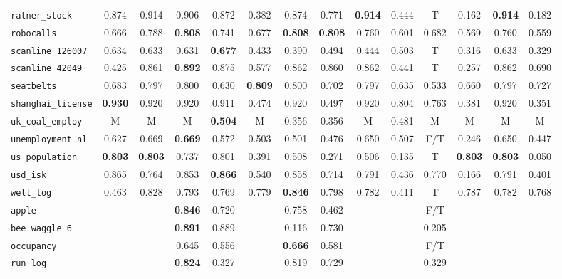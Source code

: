 \begin{tabular}{lccccccccccccc}
\verb+ratner_stock+ & 0.874 & 0.914 & 0.906 & 0.872 & 0.382 & 0.874 & 0.771 & \textbf{0.914} & 0.444 & T & 0.162 & \textbf{0.914} & 0.182\\
\verb+robocalls+ & 0.666 & 0.788 & \textbf{0.808} & 0.741 & 0.677 & \textbf{0.808} & \textbf{0.808} & 0.760 & 0.601 & 0.682 & 0.569 & 0.760 & 0.559\\
\verb+scanline_126007+ & 0.634 & 0.633 & 0.631 & \textbf{0.677} & 0.433 & 0.390 & 0.494 & 0.444 & 0.503 & T & 0.316 & 0.633 & 0.329\\
\verb+scanline_42049+ & 0.425 & 0.861 & \textbf{0.892} & 0.875 & 0.577 & 0.862 & 0.860 & 0.862 & 0.441 & T & 0.257 & 0.862 & 0.690\\
\verb+seatbelts+ & 0.683 & 0.797 & 0.800 & 0.630 & \textbf{0.809} & 0.800 & 0.702 & 0.797 & 0.635 & 0.533 & 0.660 & 0.797 & 0.727\\
\verb+shanghai_license+ & \textbf{0.930} & 0.920 & 0.920 & 0.911 & 0.474 & 0.920 & 0.497 & 0.920 & 0.804 & 0.763 & 0.381 & 0.920 & 0.351\\
\verb+uk_coal_employ+ & M & M & M & \textbf{0.504} & M & 0.356 & 0.356 & M & 0.481 & M & M & M & M\\
\verb+unemployment_nl+ & 0.627 & 0.669 & \textbf{0.669} & 0.572 & 0.503 & 0.501 & 0.476 & 0.650 & 0.507 & F/T & 0.246 & 0.650 & 0.447\\
\verb+us_population+ & \textbf{0.803} & \textbf{0.803} & 0.737 & 0.801 & 0.391 & 0.508 & 0.271 & 0.506 & 0.135 & T & \textbf{0.803} & \textbf{0.803} & 0.050\\
\verb+usd_isk+ & 0.865 & 0.764 & 0.853 & \textbf{0.866} & 0.540 & 0.858 & 0.714 & 0.791 & 0.436 & 0.770 & 0.166 & 0.791 & 0.401\\
\verb+well_log+ & 0.463 & 0.828 & 0.793 & 0.769 & 0.779 & \textbf{0.846} & 0.798 & 0.782 & 0.411 & T & 0.787 & 0.782 & 0.768\\
\hline
\verb+apple+ &  &  & \textbf{0.846} & 0.720 &  & 0.758 & 0.462 &  &  & F/T &  &  & \\
\verb+bee_waggle_6+ &  &  & \textbf{0.891} & 0.889 &  & 0.116 & 0.730 &  &  & 0.205 &  &  & \\
\verb+occupancy+ &  &  & 0.645 & 0.556 &  & \textbf{0.666} & 0.581 &  &  & F/T &  &  & \\
\verb+run_log+ &  &  & \textbf{0.824} & 0.327 &  & 0.819 & 0.729 &  &  & 0.329 &  &  & \\
\hline
\end{tabular}
